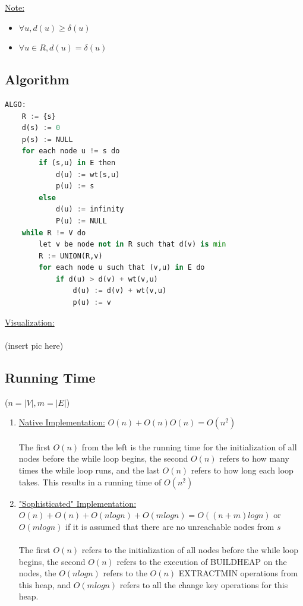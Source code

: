 \documentclass[12pt]{article}
\begin{document}
\underline{Note:}
\begin{itemize}
	\item{$\forall u, d(u) \geq \delta (u)$}
	\item{$\forall u \in R, d(u) = \delta (u)$}
\end{itemize}

\subsection{Algorithm}

\begin{lstlisting}[language=Python]
ALGO:
	R := {s}
	d(s) := 0
	p(s) := NULL
	for each node u != s do
		if (s,u) in E then
			d(u) := wt(s,u)
			p(u) := s
		else
			d(u) := infinity
			P(u) := NULL
	while R != V do
		let v be node not in R such that d(v) is min
		R := UNION(R,v)
		for each node u such that (v,u) in E do
			if d(u) > d(v) + wt(v,u)
				d(u) := d(v) + wt(v,u)
				p(u) := v
\end{lstlisting}

\underline{Visualization:}\\
\\
(insert pic here)

\subsection{Running Time}

($n = |V|, m = |E|$)

\begin{enumerate}
	\item{ \underline{Native Implementation:} $O(n) + O(n)O(n) = O(n^2)$\\
	\\
	The first $O(n)$ from the left is the running time for the initialization of all nodes before the while loop begins, the second $O(n)$ refers to how many times the while loop runs, and the last $O(n)$ refers to how long each loop takes. This results in a running time of $O(n^2)$}
	\item{ \underline{"Sophisticated" Implementation:}\\ $O(n) + O(n) + O(nlogn) + O(mlogn) = O((n+m)logn)$ or $O(mlogn)$ if it is assumed that there are no unreachable nodes from $s$}\\
	\\
	The first $O(n)$ refers to the initialization of all nodes before the while loop begins, the second $O(n)$ refers to the execution of BUILDHEAP on the nodes, the $O(nlogn)$ refers to the $O(n)$ EXTRACTMIN operations from this heap, and $O(mlogn)$ refers to all the change key operations for this heap.
\end{enumerate}
\end{document}
